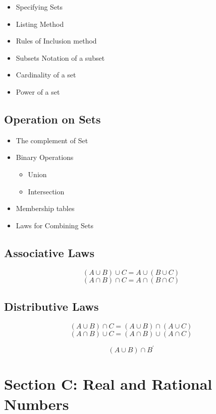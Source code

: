 \documentclass[]{report}
\begin{document}
\begin{itemize}
	\item Specifying Sets
	\item Listing Method
	\item Rules of Inclusion method
\end{itemize}


\begin{itemize}
	\item Subsets Notation of a subset
	\item Cardinality of a set
	\item Power of a set
\end{itemize}

\subsection*{Operation on Sets}

\begin{itemize}
	\item The complement of Set
	\item Binary Operations
	\begin{itemize}
		\item Union
		\item Intersection
	\end{itemize}
	\item Membership tables
	\item Laws for Combining Sets
\end{itemize}

\newpage


\subsection*{Associative Laws}
\[ (A \cup B) \cup C =  A \cup (B \cup C)  \]
\[ (A \cap B) \cap C =  A \cap (B \cap C)  \]

\subsection*{Distributive Laws}
\[ (A \cup B) \cap C =  (A \cup B) \cap (A \cup C)  \]
\[ (A \cap B) \cup C =  (A \cap B) \cup (A \cap C)  \]


\[ (A \cup B) \cap B^{\prime} \]
\section*{Section C: Real and Rational Numbers}
\end{document}
